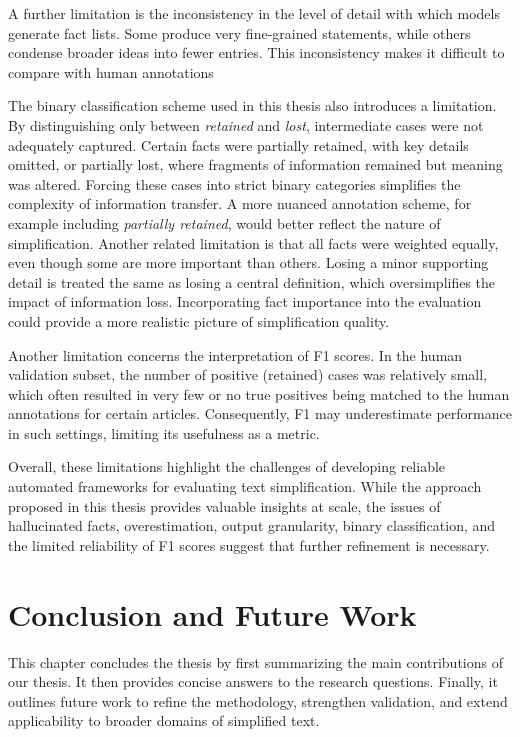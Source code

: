 \documentclass{DESSThesis}
\begin{document}
A further limitation is the inconsistency in the level of detail with which models generate fact lists. Some produce very fine-grained statements, while others condense broader ideas into fewer entries. This inconsistency makes it difficult to compare with human annotations

The binary classification scheme used in this thesis also introduces a limitation. By distinguishing only between \textit{retained} and \textit{lost}, intermediate cases were not adequately captured. Certain facts were partially retained, with key details omitted, or partially lost, where fragments of information remained but meaning was altered. Forcing these cases into strict binary categories simplifies the complexity of information transfer. A more nuanced annotation scheme, for example including \textit{partially retained}, would better reflect the nature of simplification. Another related limitation is that all facts were weighted equally, even though some are more important than others. Losing a minor supporting detail is treated the same as losing a central definition, which oversimplifies the impact of information loss. Incorporating fact importance into the evaluation could provide a more realistic picture of simplification quality.

Another limitation concerns the interpretation of F1 scores. In the human validation subset, the number of positive (retained) cases was relatively small, which often resulted in very few or no true positives being matched to the human annotations for certain articles. Consequently, F1 may underestimate performance in such settings, limiting its usefulness as a metric.

Overall, these limitations highlight the challenges of developing reliable automated frameworks for evaluating text simplification. While the approach proposed in this thesis provides valuable insights at scale, the issues of hallucinated facts, overestimation, output granularity, binary classification, and the limited reliability of F1 scores suggest that further refinement is necessary.

\chapter{Conclusion and Future Work}
This chapter concludes the thesis by first summarizing the main contributions of our thesis. It then provides concise answers to the research questions. Finally, it outlines future work to refine the methodology, strengthen validation, and extend applicability to broader domains of simplified text.
\end{document}
